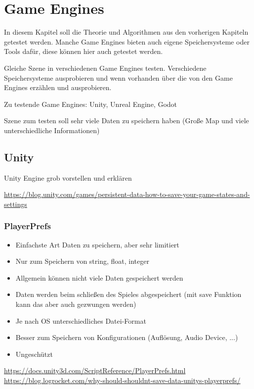 \chapter{Game Engines}\label{ch:gameengines}
In diesem Kapitel soll die Theorie und Algorithmen aus den vorherigen Kapiteln 
getestet werden. Manche Game Engines bieten auch eigene Speichersysteme oder
Tools dafür, diese können hier auch getestet werden.

Gleiche Szene in verschiedenen Game Engines testen. 
Verschiedene Speichersysteme ausprobieren und wenn vorhanden über die von den Game Engines erzählen und ausprobieren.

Zu testende Game Engines: Unity, Unreal Engine, Godot

Szene zum testen soll sehr viele Daten zu speichern haben (Große Map und viele unterschiedliche Informationen)


\section{Unity}
Unity Engine grob vorstellen und erklären

\url{https://blog.unity.com/games/persistent-data-how-to-save-your-game-states-and-settings}


\subsection{PlayerPrefs}
\begin{itemize}
    \item Einfachste Art Daten zu speichern, aber sehr limitiert
    \item Nur zum Speichern von string, float, integer
    \item Allgemein können nicht viele Daten gespeichert werden
    \item Daten werden beim schließen des Spieles abgespeichert (mit save Funktion kann das aber auch gezwungen werden)
    \item Je nach OS unterschiedliches Datei-Format
    \item Besser zum Speichern von Konfigurationen (Auflösung, Audio Device, ...)
    \item Ungeschützt
\end{itemize}

\url{https://docs.unity3d.com/ScriptReference/PlayerPrefs.html}\\
\url{https://blog.logrocket.com/why-should-shouldnt-save-data-unitys-playerprefs/}

